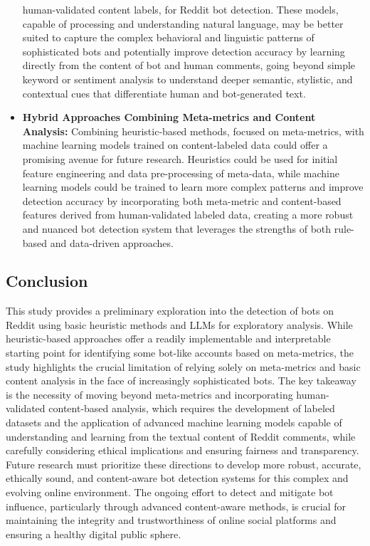 \documentclass[
  12pt,
  letterpaper,
  DIV=11,
  numbers=noendperiod,
  abstract]{scrartcl}
\begin{document}
\begin{itemize}
  human-validated content labels, for Reddit bot detection. These
  models, capable of processing and understanding natural language, may
  be better suited to capture the complex behavioral and linguistic
  patterns of sophisticated bots and potentially improve detection
  accuracy by learning directly from the content of bot and human
  comments, going beyond simple keyword or sentiment analysis to
  understand deeper semantic, stylistic, and contextual cues that
  differentiate human and bot-generated text.
\item
  \textbf{Hybrid Approaches Combining Meta-metrics and Content
  Analysis:} Combining heuristic-based methods, focused on meta-metrics,
  with machine learning models trained on content-labeled data could
  offer a promising avenue for future research. Heuristics could be used
  for initial feature engineering and data pre-processing of meta-data,
  while machine learning models could be trained to learn more complex
  patterns and improve detection accuracy by incorporating both
  meta-metric and content-based features derived from human-validated
  labeled data, creating a more robust and nuanced bot detection system
  that leverages the strengths of both rule-based and data-driven
  approaches.
\end{itemize}

\subsection{Conclusion}\label{conclusion}

This study provides a preliminary exploration into the detection of bots
on Reddit using basic heuristic methods and LLMs for exploratory
analysis. While heuristic-based approaches offer a readily implementable
and interpretable starting point for identifying some bot-like accounts
based on meta-metrics, the study highlights the crucial limitation of
relying solely on meta-metrics and basic content analysis in the face of
increasingly sophisticated bots. The key takeaway is the necessity of
moving beyond meta-metrics and incorporating human-validated
content-based analysis, which requires the development of labeled
datasets and the application of advanced machine learning models capable
of understanding and learning from the textual content of Reddit
comments, while carefully considering ethical implications and ensuring
fairness and transparency. Future research must prioritize these
directions to develop more robust, accurate, ethically sound, and
content-aware bot detection systems for this complex and evolving online
environment. The ongoing effort to detect and mitigate bot influence,
particularly through advanced content-aware methods, is crucial for
maintaining the integrity and trustworthiness of online social platforms
and ensuring a healthy digital public sphere.
\end{document}
